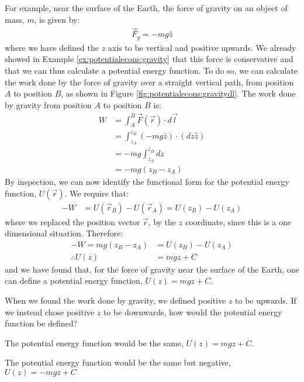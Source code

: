 For example, near the surface of the Earth, the force of gravity on an object of mass, $m$, is given by:
\begin{align*}
\vec F_g = -mg \hat z
\end{align*}
where we have defined the $z$ axis to be vertical and positive upwards. We already showed in Example \ref{ex:potentialecons:gravity} that this force is conservative and that we can thus calculate a potential energy function. To do so, we can calculate the work done by the force of gravity over a straight vertical path, from position $A$ to position $B$, as shown in Figure \ref{fig:potentialecons:gravitydl}.
The work done by gravity from position $A$ to position $B$ is:
\begin{align*}
W &= \int_A^B \vec F(\vec r) \cdot d\vec l\\
&= \int_{z_A}^{z_B} ( -mg \hat z) \cdot (dz \hat z) \\
&= -mg \int_{z_A}^{z_B} dz\\
&= -mg(z_B-z_A) 
\end{align*} 
By inspection, we can now identify the functional form for the potential energy function, $U(\vec r)$. We require that:
\begin{align*}
-W &= U(\vec r_B) - U(\vec r_A) = U(z_B) - U(z_A)
\end{align*}
where we replaced the position vector $\vec r$, by the $z$ coordinate, since this is a one dimensional situation. Therefore:
\begin{align*}
-W=mg(z_B-z_A)&= U(z_B) - U(z_A)\\
\therefore U(z) &= mgz + C
\end{align*} 
and we have found that, for the force of gravity near the surface of the Earth, one can define a potential energy function, $U(z) = mgz +C$.

\begin{checkpoint}
\begin{MCquestion}{When we found the work done by gravity, we defined positive $z$ to be upwards. If we instead chose positive $z$ to be downwards, how would the potential energy function be defined?}
\item The potential energy function would be the same, $U(z)=mgz+C$.
\item The potential energy function would be the same but negative, $U(z)=-mgz+C$ \correct
\end{MCquestion}
\end{checkpoint}

